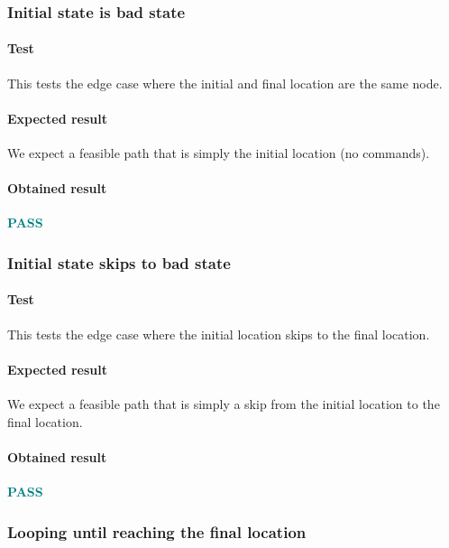 \documentclass[letterpaper,12pt]{article}
\begin{document}
\subsubsection{Initial state is bad state}
\paragraph{Test}
This tests the edge case where the initial and final location are the same node.
\paragraph{Expected result}
We expect a feasible path that is simply the initial location (no commands).
\paragraph{Obtained result}
\textbf{\textcolor{teal}{PASS}}


\subsubsection{Initial state skips to bad state}
\paragraph{Test}
This tests the edge case where the initial location skips to the final location.
\paragraph{Expected result}
We expect a feasible path that is simply a skip from the initial location to the final location.
\paragraph{Obtained result}
\textbf{\textcolor{teal}{PASS}}

\subsubsection{Looping until reaching the final location}
\end{document}
